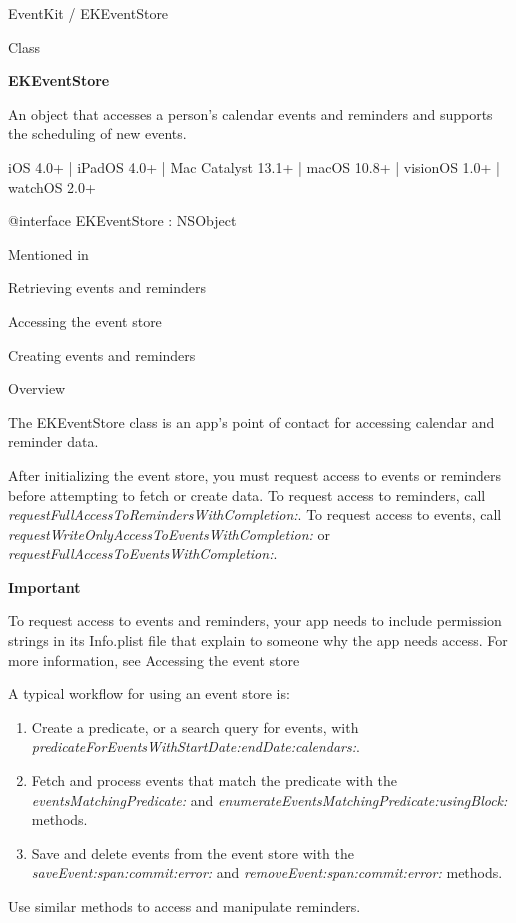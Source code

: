 \documentclass{article}
\title{}
\author{}
\date{}
\begin{document}
EventKit / EKEventStore

Class

\textbf{EKEventStore}

An object that accesses a person's calendar events and reminders and supports the scheduling of new events.

iOS 4.0+ | iPadOS 4.0+ | Mac Catalyst 13.1+ | macOS 10.8+ | visionOS 1.0+ | watchOS 2.0+

@interface EKEventStore : NSObject

Mentioned in

\href{}{}Retrieving events and reminders

\href{}{}Accessing the event store

\href{}{}Creating events and reminders

Overview

The EKEventStore class is an app's point of contact for accessing calendar and reminder data.

After initializing the event store, you must request access to events or reminders before attempting to fetch or create data. To request access to reminders, call \textit{requestFullAccessToRemindersWithCompletion:}. To request access to events, call \textit{requestWriteOnlyAccessToEventsWithCompletion:} or \textit{requestFullAccessToEventsWithCompletion:}.

\textbf{Important}

To request access to events and reminders, your app needs to include permission strings in its Info.plist file that explain to someone why the app needs access. For more information, see \href{}{}Accessing the event store

A typical workflow for using an event store is:

\begin{enumerate}
    \item Create a predicate, or a search query for events, with \textit{predicateForEventsWithStartDate:endDate:calendars:}.
    \item Fetch and process events that match the predicate with the \textit{eventsMatchingPredicate:} and \textit{enumerateEventsMatchingPredicate:usingBlock:} methods.
    \item Save and delete events from the event store with the \textit{saveEvent:span:commit:error:} and \textit{removeEvent:span:commit:error:} methods.
\end{enumerate}

Use similar methods to access and manipulate reminders.
\end{document}
